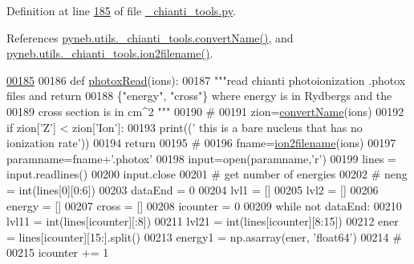 Definition at line \hyperlink{__chianti__tools_8py_source_l00185}{185} of file \hyperlink{__chianti__tools_8py_source}{\-\_\-chianti\-\_\-tools.\-py}.



References \hyperlink{__chianti__tools_8py_source_l00353}{pyneb.\-utils.\-\_\-chianti\-\_\-tools.\-convert\-Name()}, and \hyperlink{__chianti__tools_8py_source_l00396}{pyneb.\-utils.\-\_\-chianti\-\_\-tools.\-ion2filename()}.


\begin{DoxyCode}
\hypertarget{namespacepyneb_1_1utils_1_1__chianti__tools_l00185}{}\hyperlink{namespacepyneb_1_1utils_1_1__chianti__tools_a25b33696ac2b1d2f01e5789a70a234ec}{00185} 
00186 \textcolor{keyword}{def }\hyperlink{namespacepyneb_1_1utils_1_1__chianti__tools_a25b33696ac2b1d2f01e5789a70a234ec}{photoxRead}(ions):
00187     \textcolor{stringliteral}{"""read chianti photoionization .photox files and return}
00188 \textcolor{stringliteral}{        \{"energy", "cross"\} where energy is in Rydbergs and the}
00189 \textcolor{stringliteral}{        cross section is in cm^2  """}
00190     \textcolor{comment}{#}
00191     zion=\hyperlink{namespacepyneb_1_1utils_1_1__chianti__tools_a8038874902563556b0a8b536f52d3194}{convertName}(ions)
00192     \textcolor{keywordflow}{if} zion[\textcolor{stringliteral}{'Z'}] < zion[\textcolor{stringliteral}{'Ion'}]:
00193         print((\textcolor{stringliteral}{' this is a bare nucleus that has no ionization rate'}))
00194         \textcolor{keywordflow}{return}
00195     \textcolor{comment}{#}
00196     fname=\hyperlink{namespacepyneb_1_1utils_1_1__chianti__tools_a7748521ca99103785680d691667ce851}{ion2filename}(ions)
00197     paramname=fname+\textcolor{stringliteral}{'.photox'}
00198     input=open(paramname,\textcolor{stringliteral}{'}\textcolor{stringliteral}{r')}
00199 \textcolor{stringliteral}{    lines = input.readlines()}
00200 \textcolor{stringliteral}{    input.close}
00201 \textcolor{stringliteral}{    }\textcolor{comment}{# get number of energies}
00202 \textcolor{comment}{#    neng = int(lines[0][0:6])}
00203     dataEnd = 0
00204     lvl1 = []
00205     lvl2 = []
00206     energy = []
00207     cross = []
00208     icounter = 0
00209     \textcolor{keywordflow}{while} \textcolor{keywordflow}{not} dataEnd:
00210         lvl11 = int(lines[icounter][:8])
00211         lvl21 = int(lines[icounter][8:15])
00212         ener = lines[icounter][15:].split()
00213         energy1 = np.asarray(ener, \textcolor{stringliteral}{'float64'})
00214         \textcolor{comment}{#}
00215         icounter += 1

\end{DoxyCode}
